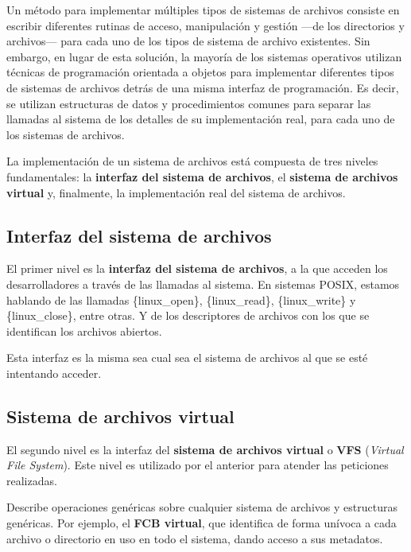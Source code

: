 Un método para implementar múltiples tipos de sistemas de archivos
consiste en escribir diferentes rutinas de acceso, manipulación y
gestión ---de los directorios y archivos--- para cada uno de los tipos
de sistema de archivo existentes. Sin embargo, en lugar de esta
solución, la mayoría de los sistemas operativos utilizan técnicas de
programación orientada a objetos para implementar diferentes tipos de
sistemas de archivos detrás de una misma interfaz de programación. Es
decir, se utilizan estructuras de datos y procedimientos comunes para
separar las llamadas al sistema de los detalles de su implementación
real, para cada uno de los sistemas de archivos.

La implementación de un sistema de archivos está compuesta de tres
niveles fundamentales: la \textbf{interfaz del sistema de archivos}, el
\textbf{sistema de archivos virtual} y, finalmente, la implementación
real del sistema de archivos.

\subsection{Interfaz del sistema de
archivos}\label{_interfaz_del_sistema_de_archivos}

{} El primer nivel es la \textbf{interfaz del sistema de archivos}, a la
que acceden los desarrolladores a través de las llamadas al sistema. En
sistemas POSIX, estamos hablando de las llamadas \{linux\_open\},
\{linux\_read\}, \{linux\_write\} y \{linux\_close\}, entre otras. Y de
los descriptores de archivos con los que se identifican los archivos
abiertos.

Esta interfaz es la misma sea cual sea el sistema de archivos al que se
esté intentando acceder.

\subsection{Sistema de archivos
virtual}\label{_sistema_de_archivos_virtual}

{} El segundo nivel es la interfaz del \textbf{sistema de archivos
virtual} o \textbf{{}VFS} (\emph{Virtual File System}). Este nivel es
utilizado por el anterior para atender las peticiones realizadas.

Describe operaciones genéricas sobre cualquier sistema de archivos y
estructuras genéricas. Por ejemplo, el \textbf{FCB virtual}{}, que
identifica de forma unívoca a cada archivo o directorio en uso en todo
el sistema, dando acceso a sus metadatos.

